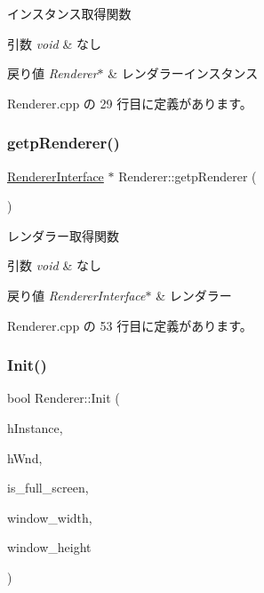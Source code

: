 インスタンス取得関数 


\begin{DoxyParams}{引数}
{\em void} & なし \\
\hline
\end{DoxyParams}

\begin{DoxyRetVals}{戻り値}
{\em Renderer$\ast$} & レンダラーインスタンス \\
\hline
\end{DoxyRetVals}


 Renderer.\+cpp の 29 行目に定義があります。

\mbox{\label{class_renderer_a1c49b796eff197f77ef3f75757f7d468}} 
\subsubsection{\texorpdfstring{getp\+Renderer()}{getpRenderer()}}
{\footnotesize\ttfamily \mbox{\hyperlink{class_renderer_interface}{Renderer\+Interface}} $\ast$ Renderer\+::getp\+Renderer (\begin{DoxyParamCaption}{ }\end{DoxyParamCaption})}



レンダラー取得関数 


\begin{DoxyParams}{引数}
{\em void} & なし \\
\hline
\end{DoxyParams}

\begin{DoxyRetVals}{戻り値}
{\em Renderer\+Interface$\ast$} & レンダラー \\
\hline
\end{DoxyRetVals}


 Renderer.\+cpp の 53 行目に定義があります。

\mbox{\label{class_renderer_a8d576add80187f5be3f24ec6a8108100}} 
\subsubsection{\texorpdfstring{Init()}{Init()}}
{\footnotesize\ttfamily bool Renderer\+::\+Init (\begin{DoxyParamCaption}\item[{H\+I\+N\+S\+T\+A\+N\+CE}]{h\+Instance,  }\item[{H\+W\+ND}]{h\+Wnd,  }\item[{B\+O\+OL}]{is\+\_\+full\+\_\+screen,  }\item[{int}]{window\+\_\+width,  }\item[{int}]{window\+\_\+height }\end{DoxyParamCaption})}



